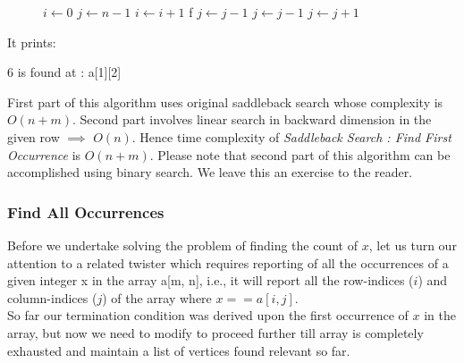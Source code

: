 \begin{figure}[H]
\begin{center}
\end{center}
\begin{algorithmic}[1]
    \State $i \gets 0$
    \State $j \gets n - 1$
                \State $i \gets i + 1$
           f 
               \State $j \gets j - 1$           
            \EndIf
        \EndWhile
        \State $j \gets j - 1$ 
    \EndWhile
    \State $j \gets j + 1$ 
\EndFunction
\end{algorithmic}
\end{figure}





It prints:
\begin{boxedverbatim}
6 is found at : a[1][2]
\end{boxedverbatim}

First part of this algorithm uses original saddleback search whose complexity is $O(n + m)$. Second part involves linear search in backward dimension in the given row $\implies$ $O(n)$. Hence time complexity of \textit{Saddleback Search : Find First Occurrence} is $O(n + m)$. Please note that second part of this algorithm can be accomplished using binary search. We leave this an exercise to the reader.


\subsubsection{Find All Occurrences}
Before we undertake solving the problem of finding the count of $x$, let us turn our attention to a related twister which requires reporting of all the occurrences of a given integer x in the array a[m, n], i.e., it will report all the row-indices ($i$) and column-indices ($j$) of the array where $x == a[i, j]$.
\vspace{1mm}\\
So far our termination condition was derived upon the first occurrence of $x$ in the array, but now we need to modify to proceed further till array is completely exhausted and maintain a list of vertices found relevant so far.
\vspace{1mm}\\



